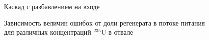 \begin{figure}[ht]
  \caption{Каскад с разбавлением на входе}\label{fig:diluted_feed}
\end{figure}

\begin{figure}[ht]
  \caption{Зависимость величин ошибок от доли регенерата в потоке питания для различных концентраций $^{235}$U в отвале}\label{fig:pre}
\end{figure}


